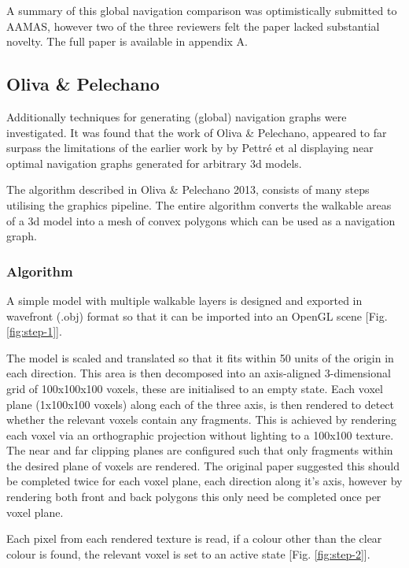     A summary of this global navigation comparison was optimistically submitted to AAMAS, however two of the three reviewers felt the paper lacked substantial novelty. The full paper is available in appendix A.%
    
    \subsection*{Oliva \& Pelechano}
    Additionally techniques for generating (global) navigation graphs were investigated. It was found that the work of Oliva \& Pelechano\cite{OP11,OP12,OP13}, appeared to far surpass the limitations of the earlier work by by Pettr\'{e} et al\cite{PLT05} displaying near optimal navigation graphs generated for arbitrary 3d models. 
    
    The algorithm described in Oliva \& Pelechano 2013\cite{OP13}, consists of many steps utilising the graphics pipeline. The entire algorithm converts the walkable areas of a 3d model into a mesh of convex polygons which can be used as a navigation graph.
    
    \subsubsection*{Algorithm}
    
      A simple model with multiple walkable layers is designed and exported in wavefront (.obj) format so that it can be imported into an OpenGL scene [Fig. \ref{fig:step-1}].
      
      The model is scaled and translated so that it fits within 50 units of the origin in each direction. This area is then decomposed into an axis-aligned 3-dimensional grid of 100x100x100 voxels, these are initialised to an empty state. Each voxel plane (1x100x100 voxels) along each of the three axis, is then rendered to detect whether the relevant voxels contain any fragments. This is achieved by rendering each voxel via an orthographic projection without lighting to a 100x100 texture. The near and far clipping planes are configured such that only fragments within the desired plane of voxels are rendered. The original paper suggested this should be completed twice for each voxel plane, each direction along it's axis, however by rendering both front and back polygons this only need be completed once per voxel plane.
      
      Each pixel from each rendered texture is read, if a colour other than the clear colour is found, the relevant voxel is set to an active state [Fig. \ref{fig:step-2}].
      
